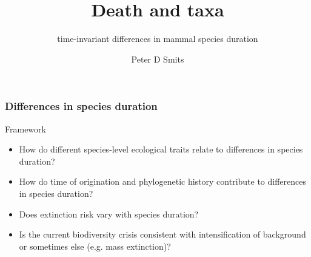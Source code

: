 \documentclass{beamer}
\title{Death and taxa}
\subtitle{time-invariant differences in mammal species duration}
\author{Peter D Smits}
\institute{Committee on Evolutionary Biology}
\date{}
\begin{document}
\begin{frame}
  \titlepage
\end{frame}

\begin{frame}
  \frametitle{Differences in species duration}

  \begin{block}{Framework}
    \begin{itemize}
      \item How do different species-level ecological traits relate to differences in species duration?
      \item How do time of origination and phylogenetic history contribute to differences in species duration?
      \item Does extinction risk vary with species duration?
      \item Is the current biodiversity crisis consistent with intensification of background or sometimes else (e.g. mass extinction)?
    \end{itemize}
  \end{block}
\end{frame}
\end{document}
